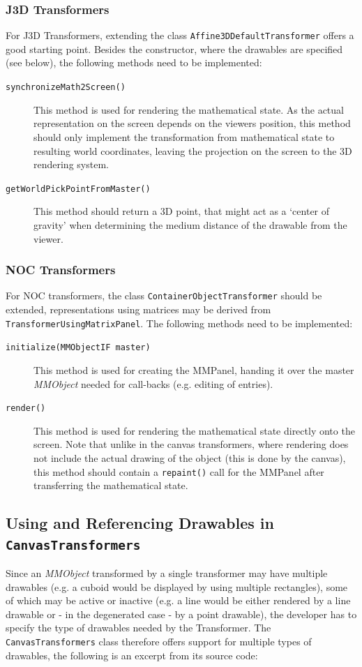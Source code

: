 \documentclass[a4paper,12pt]{book}
\newcommand{\mmo}{\emph{MMObject }}
\begin{document}
\subsubsection{J3D Transformers}
For J3D Transformers, extending the class {\tt Affine3DDefaultTransformer} offers a good starting point. Besides the constructor, 
where the drawables are specified (see below), the following methods need to be implemented:
\begin{description}
\item[{\tt synchronizeMath2Screen()}] This method is used for rendering the mathematical state. As the actual representation on
the screen depends on the viewers position, this method should only implement the transformation from mathematical state to 
resulting world coordinates, leaving the projection on the screen to the 3D rendering system.
 
\item[{\tt getWorldPickPointFromMaster()}] This method should return a 3D point, that might act as a `center of gravity' when 
determining the medium distance of the drawable from the viewer. 
\end{description}

\subsubsection{NOC Transformers}
For NOC transformers, the class {\tt ContainerObjectTransformer} should be extended, representations using matrices may be 
derived from\\ {\tt TransformerUsingMatrixPanel}. The following methods need to be implemented:
\begin{description}
\item[{\tt initialize(MMObjectIF master)}] This method is used for creating the MMPanel, handing it over the master \mmo
needed for call-backs (e.g. editing of entries).
\item[{\tt render()}] This method is used for rendering the mathematical state directly onto the screen. Note that unlike in the
canvas transformers, where rendering does not include the actual drawing of the object (this is done by the canvas), this 
method should contain a {\tt repaint()} call for the MMPanel after transferring the mathematical state.
\end{description}

\subsection{Using and Referencing Drawables in {\tt CanvasTransformers}}
Since an \mmo transformed by a single transformer may have multiple drawables (e.g. a cuboid would be displayed by using
multiple rectangles), some of which may be active or inactive (e.g. a line would be either rendered by a line drawable or 
- in the degenerated case - by a point drawable), the developer has to specify the type of drawables needed by the Transformer.
The {\tt CanvasTransformers} class therefore offers support for multiple types of drawables, the following is an excerpt from 
its source code:
\end{document}
